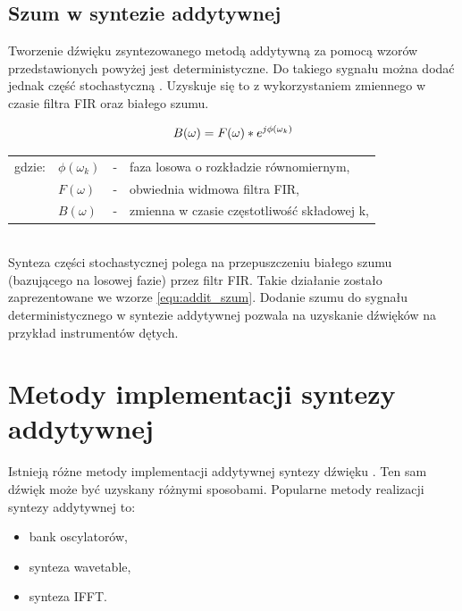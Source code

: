 \subsection{Szum w syntezie addytywnej}
Tworzenie dźwięku zsyntezowanego metodą addytywną za pomocą wzorów przedstawionych powyżej jest deterministyczne. Do takiego sygnału można dodać jednak część stochastyczną \cite{add_szum}. Uzyskuje się to z wykorzystaniem zmiennego w czasie filtra FIR oraz białego szumu.

\begin{equation} \label{equ:addit_szum}
B(\omega) = F(\omega)*e^{j\phi(\omega_{k})} \\  
\end{equation}
\begin{tabular}{ l l l l}
	gdzie: & $\phi(\omega_{k})$ &  - & faza losowa o rozkładzie równomiernym, \\
	& $F(\omega)$ &  - & obwiednia widmowa filtra FIR, \\
	&	$B(\omega)$ & - & zmienna w czasie częstotliwość składowej k, \\
\end{tabular} \\

Synteza części stochastycznej polega na przepuszczeniu białego szumu (bazującego na losowej fazie) przez filtr FIR. Takie działanie zostało zaprezentowane we wzorze \ref{equ:addit_szum}.
Dodanie szumu do sygnału deterministycznego w syntezie addytywnej pozwala na uzyskanie dźwięków na przykład instrumentów dętych.


\section{Metody implementacji syntezy addytywnej}
Istnieją różne metody implementacji addytywnej syntezy dźwięku \cite{add_imp_meth}. Ten sam dźwięk może być uzyskany różnymi sposobami. Popularne metody realizacji syntezy addytywnej to:
\begin{itemize}
	\item bank oscylatorów,
	\item synteza wavetable,
	\item synteza IFFT.
\end{itemize}

